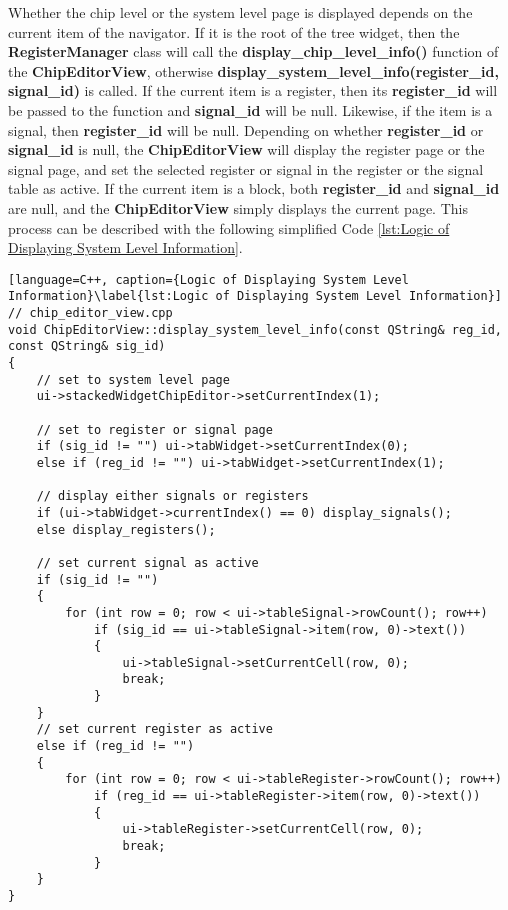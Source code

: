 Whether the chip level or the system level page is displayed depends on the current item of the navigator. If it is the root of the tree widget, then the \textbf{RegisterManager} class will call the \textbf{display\_chip\_level\_info()} function of the \textbf{ChipEditorView}, otherwise \textbf{display\_system\_level\_info(register\_id, signal\_id)} is called. If the current item is a register, then its \textbf{register\_id} will be passed to the function and \textbf{signal\_id} will be null. Likewise, if the item is a signal, then \textbf{register\_id} will be null. Depending on whether \textbf{register\_id} or \textbf{signal\_id} is null, the \textbf{ChipEditorView} will display the register page or the signal page, and set the selected register or signal in the register or the signal table as active. If the current item is a block, both \textbf{register\_id} and \textbf{signal\_id} are null, and the \textbf{ChipEditorView} simply displays the current page. This process can be described with the following simplified Code \ref{lst:Logic of Displaying System Level Information}.

\begin{lstlisting}[language=C++, caption={Logic of Displaying System Level Information}\label{lst:Logic of Displaying System Level Information}]
// chip_editor_view.cpp
void ChipEditorView::display_system_level_info(const QString& reg_id, const QString& sig_id)
{
    // set to system level page
    ui->stackedWidgetChipEditor->setCurrentIndex(1);

    // set to register or signal page
    if (sig_id != "") ui->tabWidget->setCurrentIndex(0);
    else if (reg_id != "") ui->tabWidget->setCurrentIndex(1);

    // display either signals or registers
    if (ui->tabWidget->currentIndex() == 0) display_signals();
    else display_registers();
    
    // set current signal as active
    if (sig_id != "")
    {
        for (int row = 0; row < ui->tableSignal->rowCount(); row++)
            if (sig_id == ui->tableSignal->item(row, 0)->text())
            {
                ui->tableSignal->setCurrentCell(row, 0);
                break;
            }
    }
    // set current register as active
    else if (reg_id != "")
    {
        for (int row = 0; row < ui->tableRegister->rowCount(); row++)
            if (reg_id == ui->tableRegister->item(row, 0)->text())
            {
                ui->tableRegister->setCurrentCell(row, 0);
                break;
            }
    }
}
\end{lstlisting}

